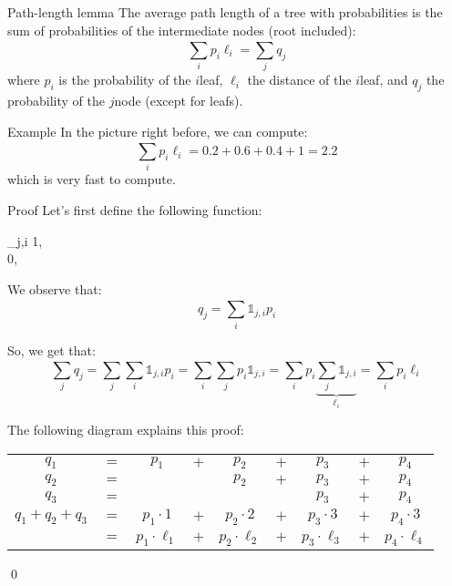 \documentclass[a4paper]{article}
\begin{document}
\begin{parag}{Path-length lemma}
    The average path length of a tree with probabilities is the sum of probabilities of the intermediate nodes (root included): 
    \[\sum_{i}^{} p_i \ell_i = \sum_{j}^{} q_j\]
    where $p_i$ is the probability of the $i$\Th leaf, $\ell_i$ the distance of the $i$\Th leaf, and $q_j$ the probability of the $j$\Th node (except for leafs).

    \begin{subparag}{Example}
        In the picture right before, we can compute: 
        \[\sum_{i}^{} p_i \ell_i = 0.2 + 0.6 + 0.4 + 1 = 2.2\]
        which is very fast to compute.
    \end{subparag}
    

    \begin{subparag}{Proof}
        Let's first define the following function:
        \begin{functionbypart}{_{j,i}}
            1, \mathspace {} \\
            0, \mathspace {}
        \end{functionbypart}

        We observe that: 
        \[q_j = \sum_{i}^{} \mathds{1}_{j,i} p_i\]
        
        So, we get that: 
        \[\sum_{j}^{} q_j = \sum_{j}^{} \sum_{i}^{} \mathds{1}_{j,i} p_i = \sum_{i}^{} \sum_{j}^{} p_i \mathds{1}_{j,i} = \sum_{i}^{} p_i \underbrace{\sum_{j}^{} \mathds{1}_{j,i}}_{\ell_i} = \sum_{i}^{} p_i \ell_i\]
        
        The following diagram explains this proof:

        \begin{center}
        \begin{tabular}{c@{\,}c@{\,}c@{\,}c@{\,}c@{\,}c@{\,}c@{\,}c@{\,}c@{\,}}
            $q_1$ & $=$ & $p_1$ & $+$ & $p_2$ & $+$ & $p_3$ & $+$ & $p_4$  \\
            $q_2$ & $=$ &    &   & $p_2$ & $+$ & $p_3$ & $+$ & $p_4$  \\
            $q_3$ & $=$ &    &   &    &   & $p_3$ & $+$ & $p_4$  \\
            \hline
            $q_1 + q_2 + q_3$ & $=$ & $p_1 \cdot 1$ & $+$ & $p_2 \cdot 2$ & $+$ & $p_3 \cdot 3$ & $+$ & $p_4 \cdot 3$  \\
            & $=$ & $p_1 \cdot \ell_1$ & $+$ & $p_2 \cdot \ell_2$ & $+$ & $p_3 \cdot \ell_3$ & $+$ & $p_4 \cdot \ell_4$ 
        \end{tabular}
        \end{center}
        

        \qed
    \end{subparag}
\end{parag}
\end{document}
